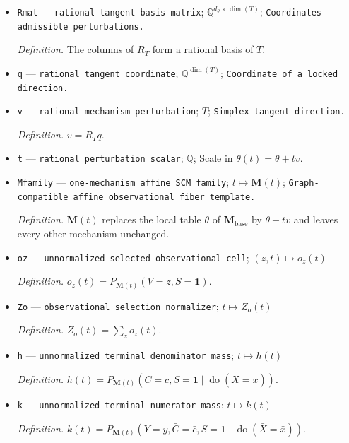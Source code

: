 \documentclass{article}
\begin{document}
\begin{itemize}
  \par\smallskip\noindent\emph{Definition.} \(T=\{w\in\mathbb Q^{d_{\theta}}:\sum_{j\text{ in each probability block}}w_j=0\}\).
  \item \texttt{Rmat} --- \texttt{rational tangent-\allowbreak{}basis matrix}; \(\mathbb Q^{d_{\theta}\times\dim(T)}\); \texttt{Coordinates admissible perturbations.}
  \par\smallskip\noindent\emph{Definition.} The columns of \(R_T\) form a rational basis of \(T\).
  \item \texttt{q} --- \texttt{rational tangent coordinate}; \(\mathbb Q^{\dim(T)}\); \texttt{Coordinate of a locked direction.}
  \item \texttt{v} --- \texttt{rational mechanism perturbation}; \(T\); \texttt{Simplex-\allowbreak{}tangent direction.}
  \par\smallskip\noindent\emph{Definition.} \(v=R_Tq\).
  \item \texttt{t} --- \texttt{rational perturbation scalar}; \(\mathbb Q\); Scale in \(\theta(t)=\theta+t v\).
  \item \texttt{Mfamily} --- \texttt{one-\allowbreak{}mechanism affine SCM family}; \(t\mapsto\mathbf M(t)\); \texttt{Graph-\allowbreak{}compatible affine observational fiber template.}
  \par\smallskip\noindent\emph{Definition.} \(\mathbf M(t)\) replaces the local table \(\theta\) of \(\mathbf M_{\mathrm{base}}\) by \(\theta+t v\) and leaves every other mechanism unchanged.
  \item \texttt{oz} --- \texttt{unnormalized selected observational cell}; \((z,t)\mapsto o_z(t)\)
  \par\smallskip\noindent\emph{Definition.} \(o_z(t)=P_{\mathbf M(t)}(V=z,S=\mathbf 1)\).
  \item \texttt{Zo} --- \texttt{observational selection normalizer}; \(t\mapsto Z_o(t)\)
  \par\smallskip\noindent\emph{Definition.} \(Z_o(t)=\sum_z o_z(t)\).
  \item \texttt{h} --- \texttt{unnormalized terminal denominator mass}; \(t\mapsto h(t)\)
  \par\smallskip\noindent\emph{Definition.} \(h(t)=P_{\mathbf M(t)}(\bar C=\bar c,S=\mathbf 1\mid\operatorname{do}(\bar X=\bar x))\).
  \item \texttt{k} --- \texttt{unnormalized terminal numerator mass}; \(t\mapsto k(t)\)
  \par\smallskip\noindent\emph{Definition.} \(k(t)=P_{\mathbf M(t)}(Y=y,\bar C=\bar c,S=\mathbf 1\mid\operatorname{do}(\bar X=\bar x))\).

\end{itemize}
\end{document}
